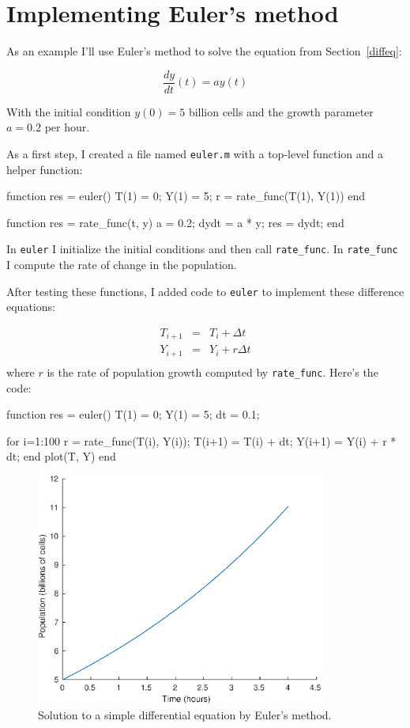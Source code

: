 \documentclass[
]{book}
\numberwithin{Answer}{chapter}
\numberwithin{Exercise}{chapter}
\begin{document}
\section{Implementing Euler's method}

As an example I'll use Euler's method to solve the equation from Section~\ref{diffeq}:

\[ \frac{dy}{dt}(t) = a y(t) \]

With the initial condition $y(0) = 5$ billion cells and
the growth parameter $a = 0.2$ per hour. 

As a first step, I created a file named {\tt euler.m} with a top-level function and a helper function:

\begin{code}
function res = euler()
    T(1) = 0;
    Y(1) = 5;
    r = rate_func(T(1), Y(1))
end

function res = rate_func(t, y)
   a = 0.2;
   dydt = a * y;
   res = dydt;
end
\end{code}

In {\tt euler} I initialize the initial conditions and then call \verb"rate_func".  In \verb"rate_func" I compute the rate of change in the population.

After testing these functions, I added code to {\tt euler} to implement these difference equations:

\begin{eqnarray}
T_{i+1} &=& T_i + \Delta t             \\
Y_{i+1} &=& Y_i + r \Delta t           \\
\end{eqnarray}
%
where $r$ is the rate of population growth computed by \verb"rate_func".
Here's the code:

\begin{code}
function res = euler()
    T(1) = 0;
    Y(1) = 5;
    dt = 0.1;
    
    for i=1:100
        r = rate_func(T(i), Y(i));
        T(i+1) = T(i) + dt;
        Y(i+1) = Y(i) + r * dt;
    end
    plot(T, Y)
end
\end{code}

\begin{figure}
\centerline{\includegraphics[height=3in]{figs/euler.eps}}
\caption{Solution to a simple differential equation by Euler's method.}
\label{fig:euler}
\end{figure}
\end{document}
